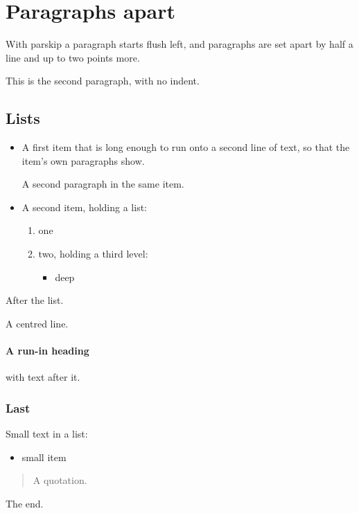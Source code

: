 \documentclass[11pt]{article}
\begin{document}
\section{Paragraphs apart}
With parskip a paragraph starts flush left, and paragraphs are set apart by half a line
and up to two points more.

This is the second paragraph, with no indent.
\subsection{Lists}
\begin{itemize}
\item A first item that is long enough to run onto a second line of text, so that the
  item's own paragraphs show.

  A second paragraph in the same item.
\item A second item, holding a list:
  \begin{enumerate}
  \item one
  \item two, holding a third level:
    \begin{itemize}
    \item deep
    \end{itemize}
  \end{enumerate}
\end{itemize}
After the list.
\begin{center}
A centred line.
\end{center}
\paragraph{A run-in heading} with text after it.
\subsubsection{Last}
{\small Small text in a list:
\begin{itemize}
\item small item
\end{itemize}}
\begin{quote}
A quotation.
\end{quote}
The end.
\end{document}
